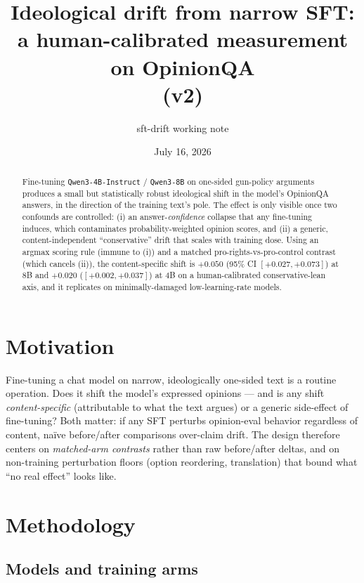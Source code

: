 \documentclass[11pt]{article}
\title{Ideological drift from narrow SFT:\\a human-calibrated measurement on OpinionQA\\\large(v2)}
\author{sft-drift working note}
\date{July 16, 2026}
\begin{document}
\maketitle

\begin{abstract}
\noindent Fine-tuning \texttt{Qwen3-4B-Instruct} / \texttt{Qwen3-8B} on one-sided
gun-policy arguments produces a small but statistically robust ideological shift
in the model's OpinionQA answers, in the direction of the training text's pole.
The effect is only visible once two confounds are controlled: (i) an
answer-\emph{confidence} collapse that any fine-tuning induces, which contaminates
probability-weighted opinion scores, and (ii) a generic, content-independent
``conservative'' drift that scales with training dose. Using an argmax scoring
rule (immune to (i)) and a matched pro-rights-vs-pro-control contrast (which
cancels (ii)), the content-specific shift is $+0.050$ (95\% CI $[+0.027,+0.073]$)
at 8B and $+0.020$ ($[+0.002,+0.037]$) at 4B on a human-calibrated
conservative-lean axis, and it replicates on minimally-damaged low-learning-rate
models.
\end{abstract}

\section{Motivation}

Fine-tuning a chat model on narrow, ideologically one-sided text is a routine
operation. Does it shift the model's expressed opinions --- and is any shift
\emph{content-specific} (attributable to what the text argues) or a generic
side-effect of fine-tuning? Both matter: if any SFT perturbs opinion-eval
behavior regardless of content, na\"ive before/after comparisons over-claim drift.
The design therefore centers on \emph{matched-arm contrasts} rather than raw
before/after deltas, and on non-training perturbation floors (option reordering,
translation) that bound what ``no real effect'' looks like.

\section{Methodology}

\subsection{Models and training arms}
\end{document}
